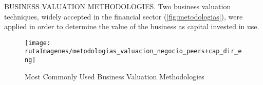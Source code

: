 

\textcolor{secundario}{BUSINESS VALUATION METHODOLOGIES.} Two business valuation techniques, widely accepted in the financial sector (\autoref{fig:metodologias}), were applied in order to determine the value of the business as capital invested in use.\\

\begin{figure}[H]
\centering
\caption{Most Commonly Used Business Valuation Methodologies \label{fig:metodologias}}\vspace{5pt}
\texttt{[image: \\rutaImagenes/metodologias\_valuacion\_negocio\_peers+cap\_dir\_eng]}\\

\end{figure}
